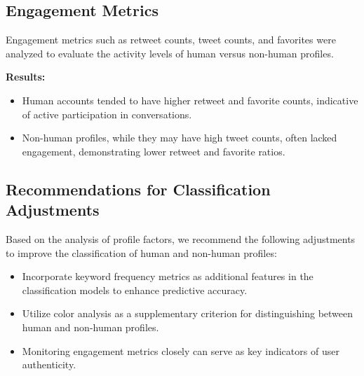\documentclass[a4paper,11pt]{article}
\begin{document}
\subsection{Engagement Metrics}
Engagement metrics such as retweet counts, tweet counts, and favorites were analyzed to evaluate the activity levels of human versus non-human profiles.

\textbf{Results:}
\begin{itemize}
    \item Human accounts tended to have higher retweet and favorite counts, indicative of active participation in conversations.
    \item Non-human profiles, while they may have high tweet counts, often lacked engagement, demonstrating lower retweet and favorite ratios.
\end{itemize}

\subsection{Recommendations for Classification Adjustments}
Based on the analysis of profile factors, we recommend the following adjustments to improve the classification of human and non-human profiles:

\begin{itemize}
    \item Incorporate keyword frequency metrics as additional features in the classification models to enhance predictive accuracy.
    \item Utilize color analysis as a supplementary criterion for distinguishing between human and non-human profiles.
    \item Monitoring engagement metrics closely can serve as key indicators of user authenticity.
\end{itemize}

\newpage

\nocite{*}
\end{document}
